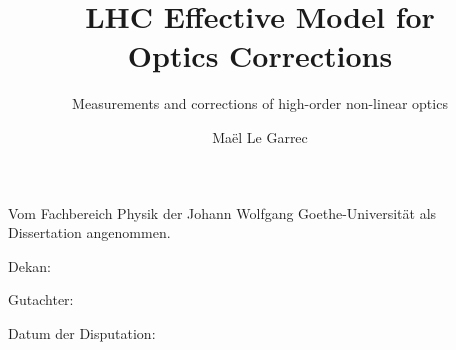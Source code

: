 {    \title{LHC Effective Model for\\Optics Corrections}
    \subtitle{Measurements and corrections of high-order non-linear optics}
    \author{Maël Le Garrec}

    \cleardoublepage
    \makesecondtitle
}


{
    \makeatletter
    \def\makethirdtitle{%
        \thispagestyle{empty} %
        \normalfont\subtitlefont\fontsize{11pt}{15pt}\selectfont%
        
        \begin{flushleft}
            Vom Fachbereich Physik der Johann Wolfgang Goethe-Universität als Dissertation angenommen.
        \end{flushleft}
        \vspace{\vspacesignatures}
        \vspace{\vspacesignatures}

        \noindent Dekan:

        \vspace{\vspacesignatures}
        \noindent Gutachter:

        \vspace{\vspacesignatures}
        \noindent Datum der Disputation:
    }
    \makeatother
    
    \clearpage
    \makethirdtitle
}